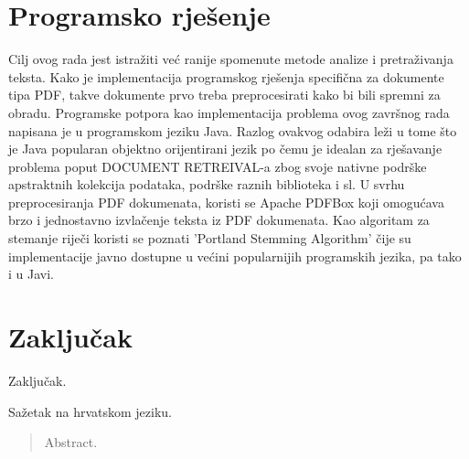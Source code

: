 \documentclass[times, utf8, zavrsni]{fer}
\begin{document}
\chapter{Programsko rješenje}
Cilj ovog rada jest istražiti već ranije spomenute metode analize i pretraživanja teksta.	Kako je implementacija programskog rješenja specifična za dokumente tipa PDF, takve dokumente prvo treba preprocesirati kako bi bili spremni za obradu.
Programske potpora kao implementacija problema ovog završnog rada napisana je u programskom jeziku Java. Razlog ovakvog odabira leži u tome što je Java popularan objektno orijentirani jezik po čemu je idealan za rješavanje problema poput DOCUMENT RETREIVAL-a zbog svoje nativne podrške apstraktnih kolekcija podataka, podrške raznih biblioteka i sl.
U svrhu preprocesiranja PDF dokumenata, koristi se Apache PDFBox koji omogućava brzo i jednostavno izvlačenje teksta iz PDF dokumenata.
Kao algoritam za stemanje riječi koristi se poznati 'Portland Stemming Algorithm' čije su implementacije javno dostupne u većini popularnijih programskih jezika, pa tako i u Javi.

\chapter{Zaključak}
Zaključak.




\begin{sazetak}
Sažetak na hrvatskom jeziku.

\end{sazetak}

\begin{abstract}
Abstract.

\end{abstract}
\end{document}
